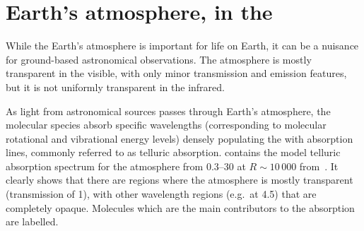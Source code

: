 
\section{Earth's atmosphere, in the \nir{}}
\label{sec:earths_atmosphere}
While the Earth's atmosphere is important for life on Earth, it can be a nuisance for ground-based astronomical observations.
The atmosphere is mostly transparent in the visible, with only minor transmission and emission features, but it is not uniformly transparent in the infrared.

As light from astronomical sources passes through Earth's atmosphere, the molecular species absorb specific wavelengths (corresponding to molecular rotational and vibrational energy levels) densely populating the \nir{} with absorption lines, commonly referred to as telluric absorption.
 contains the model telluric absorption spectrum for the atmosphere from 0.3--30\um{} at $R\sim10\,000$ from~\citet{smette_molecfit_2015}.
It clearly shows that there are regions where the atmosphere is mostly transparent (transmission of 1), with other wavelength regions (e.g.\ at 4.5\um{}) that are completely opaque.
Molecules which are the main contributors to the absorption are labelled.

